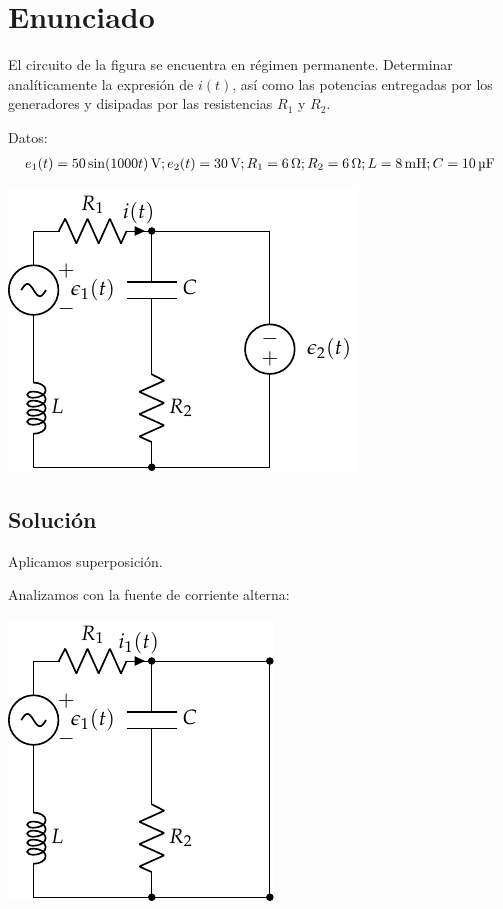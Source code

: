 \section{Enunciado}
El circuito de la figura se encuentra en régimen permanente. Determinar analíticamente la expresión de $i(t)$, así como las potencias entregadas por los generadores y disipadas por las resistencias $R_1$ y $R_2$.

Datos:
\begin{align*}
  e_1(t) = \qty[parse-numbers=false]{50 \sin(1000 t)}{\volt};
  e_2(t) = \qty{30}{\volt};
  R_1 = \qty{6}{\ohm};
  R_2 = \qty{6}{\ohm};
  L = \qty{8}{\milli\henry};
  C = \qty{10}{\micro\farad}
\end{align*}

\begin{center}
  \includegraphics{figuras/superposicion1_ej.pdf}
\end{center}

 \subsection*{Solución}

Aplicamos superposición.

Analizamos con la fuente de corriente alterna:

\begin{center}
\includegraphics{figuras/superposicion1_AC}
\end{center}

